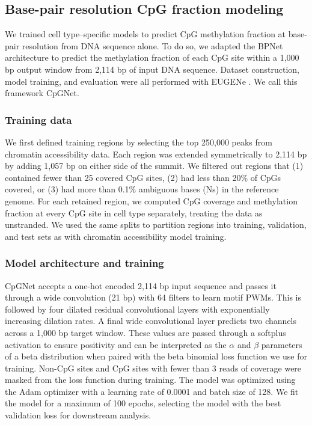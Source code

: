 \subsection{Base-pair resolution CpG fraction modeling}

We trained cell type–specific models to predict CpG methylation fraction at base-pair resolution from DNA sequence alone. To do so, we adapted the BPNet architecture to predict the methylation fraction of each CpG site within a 1,000 bp output window from 2,114 bp of input DNA sequence. Dataset construction, model training, and evaluation were all performed with EUGENe \cite{Klie2023-yr}. We call this framework CpGNet.

\subsubsection{Training data}

We first defined training regions by selecting the top 250,000 peaks from chromatin accessibility data. Each region was extended symmetrically to 2,114 bp by adding 1,057 bp on either side of the summit. We filtered out regions that (1) contained fewer than 25 covered CpG sites, (2) had less than 20\% of CpGs covered, or (3) had more than 0.1\% ambiguous bases (Ns) in the reference genome. For each retained region, we computed CpG coverage and methylation fraction at every CpG site in cell type separately, treating the data as unstranded. We used the same splits to partition regions into training, validation, and test sets as with chromatin accessibility model training.

\subsubsection{Model architecture and training}

CpGNet accepts a one-hot encoded 2,114 bp input sequence and passes it through a wide convolution (21 bp) with 64 filters to learn motif PWMs. This is followed by four dilated residual convolutional layers with exponentially increasing dilation rates. A final wide convolutional layer predicts two channels across a 1,000 bp target window. These values are passed through a softplus activation to ensure positivity and can be interpreted as the \(\alpha\) and \(\beta\) parameters of a beta distribution when paired with the beta binomial loss function we use for training. Non-CpG sites and CpG sites with fewer than 3 reads of coverage were masked from the loss function during training. The model was optimized using the Adam optimizer \cite{Kingma2014-kn} with a learning rate of 0.0001 and batch size of 128. We fit the model for a maximum of 100 epochs, selecting the model with the best validation loss for downstream analysis.

